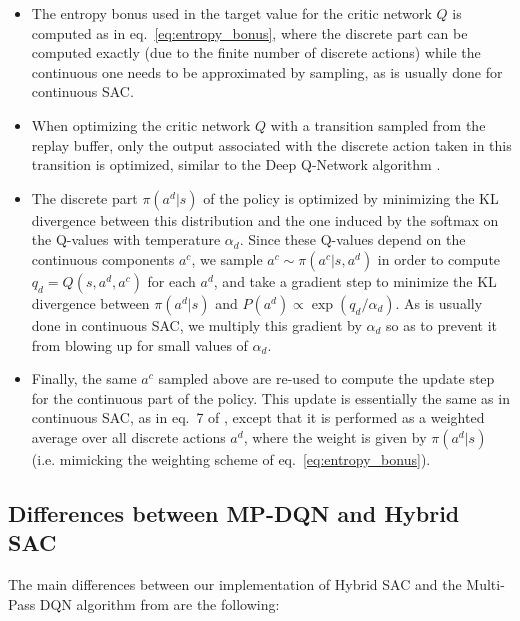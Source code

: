 \documentclass[letterpaper]{article} \usepackage{aaai20}  \usepackage{times}  \usepackage{helvet} \usepackage{courier}  \usepackage[hyphens]{url}  \usepackage{graphicx} \urlstyle{rm} \def\UrlFont{\rm}  \usepackage{graphicx}  \usepackage[section]{placeins}
\newcommand{\citet}{\cite}  \newcommand{\citep}{\cite} \DeclareMathOperator*{\softmax}{softmax}
\begin{document}
\begin{itemize} \label{appendix_differences}
    \item The entropy bonus used in the target value for the critic network $Q$ is computed as in eq.~\ref{eq:entropy_bonus}, where the discrete part can be computed exactly (due to the finite number of discrete actions) while the continuous one needs to be approximated by sampling, as is usually done for continuous SAC.
    \item When optimizing the critic network $Q$ with a transition sampled from the replay buffer, only the output associated with the discrete action taken in this transition is optimized, similar to the Deep Q-Network algorithm \citep{mnih2015human}.
    \item The discrete part $\pi(a^d | s)$ of the policy is optimized by minimizing the KL divergence between this distribution and the one induced by the softmax on the Q-values with temperature $\alpha_d$.
    Since these Q-values depend on the continuous components $a^c$, we sample $a^c \sim \pi(a^c | s, a^d)$ in order to compute $q_d = Q(s, a^d, a^c)$ for each $a^d$, and take a gradient step to minimize the KL divergence between $\pi(a^d | s)$ and $P(a^d) \propto \exp(q_d / \alpha_d)$.
    As is usually done in continuous SAC, we multiply this gradient by $\alpha_d$ so as to prevent it from blowing up for small values of $\alpha_d$.
    \item Finally, the same $a^c$ sampled above are re-used to compute the update step for the continuous part of the policy. This update is essentially the same as in continuous SAC, as in eq.~7 of \citet{haarnoja2018softapplications}, except that it is performed as a weighted average over all discrete actions $a^d$, where the weight is given by $\pi(a^d | s)$ (i.e. mimicking the weighting scheme of eq.~\ref{eq:entropy_bonus}).
\end{itemize}

\subsection{Differences between MP-DQN and Hybrid SAC}

The main differences between our implementation of Hybrid SAC and the Multi-Pass DQN algorithm from \citet{bester2019} are the following:
\end{document}
